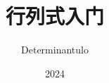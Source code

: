 \title{行列式入门}
\author{Determinantulo}
\date{2024} %

\makeatletter
\let\thetitle\@title
\let\theauthor\@author
\let\thedate\@date %
\makeatother
